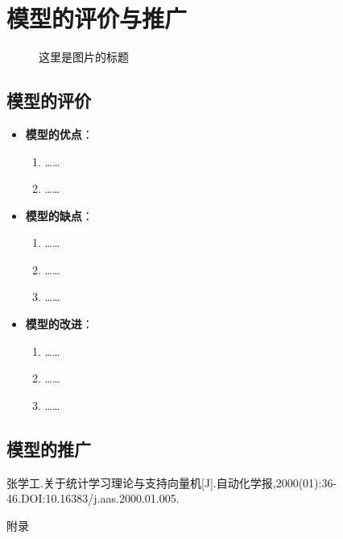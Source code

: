 \documentclass{MathorCupmodeling}
\begin{document}
	\section{模型的评价与推广}
	\begin{figure}[H]
		\caption{这里是图片的标题}\label{fig:picturename3}
	\end{figure}
	\subsection{模型的评价}
	\begin{itemize}
		\item \textbf{模型的优点}：
			\begin{enumerate}
				\item ……
				\item ……
			\end{enumerate}
		\item \textbf{模型的缺点}：
			\begin{enumerate}
				\item ……
				\item ……
				\item ……
			\end{enumerate}
		\item \textbf{模型的改进}：
			\begin{enumerate}
				\item ……
				\item ……
				\item ……
			\end{enumerate}
	\end{itemize}
	\subsection{模型的推广}

	\newpage
	\begin{thebibliography}{99}
	张学工.关于统计学习理论与支持向量机[J].自动化学报,2000(01):36-46.DOI:10.16383/j.aas.2000.01.005.
	
	\end{thebibliography}

	\newpage


	\begin{center}
		\heiti{} 附\hspace{2pc}录
	\end{center}
\end{document}
